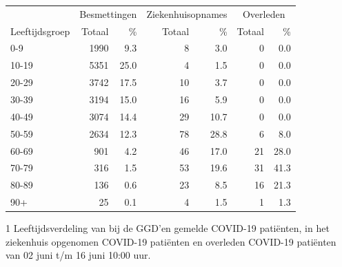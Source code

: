 \documentclass[
  english,
  man,floatsintext]{apa6}
\begin{document}
\begin{table}
\centering\begingroup\fontsize{11}{13}\selectfont

\begin{threeparttable}
\begin{tabular}{lrrrrrr}
\toprule
\multicolumn{1}{c}{ } & \multicolumn{2}{c}{Besmettingen} & \multicolumn{2}{c}{Ziekenhuisopnames} & \multicolumn{2}{c}{Overleden} \\
\cmidrule(l{3pt}r{3pt}){2-3} \cmidrule(l{3pt}r{3pt}){4-5} \cmidrule(l{3pt}r{3pt}){6-7}
Leeftijdsgroep & Totaal & \% & Totaal & \% & Totaal & \%\\
\midrule
0-9 & 1990 & 9.3 & 8 & 3.0 & 0 & 0.0\\
10-19 & 5351 & 25.0 & 4 & 1.5 & 0 & 0.0\\
20-29 & 3742 & 17.5 & 10 & 3.7 & 0 & 0.0\\
30-39 & 3194 & 15.0 & 16 & 5.9 & 0 & 0.0\\
40-49 & 3074 & 14.4 & 29 & 10.7 & 0 & 0.0\\
50-59 & 2634 & 12.3 & 78 & 28.8 & 6 & 8.0\\
60-69 & 901 & 4.2 & 46 & 17.0 & 21 & 28.0\\
70-79 & 316 & 1.5 & 53 & 19.6 & 31 & 41.3\\
80-89 & 136 & 0.6 & 23 & 8.5 & 16 & 21.3\\
90+ & 25 & 0.1 & 4 & 1.5 & 1 & 1.3\\
\bottomrule
\end{tabular}
\begin{tablenotes}
\item[1] Leeftijdsverdeling van bij de GGD’en gemelde COVID-19 patiënten, in het ziekenhuis opgenomen COVID-19 patiënten en overleden COVID-19 patiënten van 02 juni t/m 16 juni 10:00 uur.
\end{tablenotes}
\end{threeparttable}
\endgroup{}
\end{table}

\newpage
\end{document}
